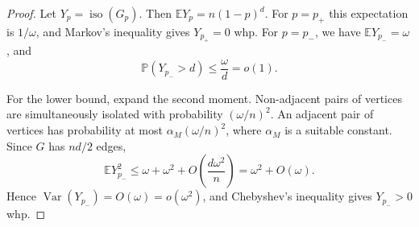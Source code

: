 \documentclass[10pt,a4paper]{amsart}
\newcommand{\whp}{whp}
\newcommand{\iso}{\operatorname{iso}}
\begin{document}
\begin{proof}
Let $Y_p=\iso(G_p)$.
Then $\mathbb{E}Y_p=n(1-p)^d$.
For $p=p_+$ this expectation is $1/\omega$, and Markov's inequality gives $Y_{p_+}=0$ \whp.
For $p=p_-$, we have $\mathbb{E}Y_{p_-}=\omega$, and
\[
  \mathbb{P}(Y_{p_-}>d)\le\frac{\omega}{d}=o(1).
\]

For the lower bound, expand the second moment.
Non-adjacent pairs of vertices are simultaneously isolated with probability $(\omega/n)^2$. An adjacent pair of vertices has probability at most $\alpha_M(\omega/n)^2$, where $\alpha_M$ is a suitable constant.
Since $G$ has $nd/2$ edges,
\[
  \mathbb{E}Y_{p_-}^2
  \le \omega+\omega^2+O\left(\frac{d\omega^2}{n}\right)
  =\omega^2+O(\omega).
\]
Hence $\operatorname{Var}(Y_{p_-})=O(\omega)=o(\omega^2)$, and Chebyshev's inequality gives $Y_{p_-}>0$ \whp.
\end{proof}



\end{document}
